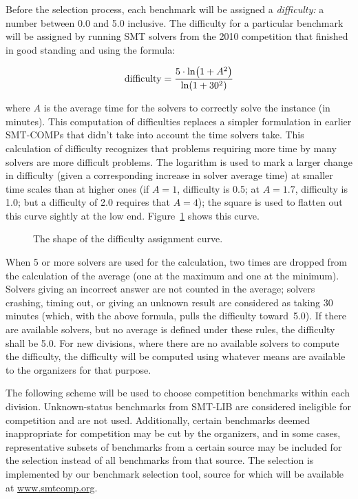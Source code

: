 \documentclass[12pt]{article}
\begin{document}
Before the selection process, each benchmark will be assigned a
\emph{difficulty:} a number between 0.0 and 5.0 inclusive.  The
difficulty for a particular benchmark will be assigned by running SMT
solvers from the 2010 competition that finished in good
standing and using the formula:

\[\mathrm{difficulty} = {5\cdot\ln\!\left(1+A^2\right) \over \ln\!\left(1+30^2\right)}\]

\noindent
where $A$ is the average time for the solvers to correctly solve the
instance (in minutes).  This computation of difficulties
replaces a simpler formulation in earlier SMT-COMPs that didn't take
into account the time solvers take.  This calculation of difficulty
recognizes that problems requiring more time by many solvers are
more difficult problems.  The logarithm is used to
mark a larger change in difficulty (given a corresponding increase in
solver average time) at smaller time scales than at higher ones (if $A=1$,
difficulty is 0.5; at $A=1.7$, difficulty is 1.0; but a difficulty of 2.0
requires that $A=4$); the square is used to flatten out this curve sightly
at the low end.  Figure~\ref{difficultyplot} shows this curve.

\begin{figure}
  \centerline{}
  \caption{The shape of the difficulty assignment curve.}
  \label{difficultyplot}
\end{figure}

When 5 or more solvers are used for the
calculation, two times are dropped from the calculation of the average
(one at the maximum and one at the minimum).  Solvers giving an
incorrect answer are not counted in the average; solvers crashing,
timing out, or giving an unknown result are considered as taking 30
minutes (which, with the above formula, pulls the difficulty
toward~5.0).  If there are available solvers, but no average is
defined under these rules, the difficulty shall be 5.0.  For new
divisions, where there are no available solvers to compute the
difficulty, the difficulty will be computed using whatever means are
available to the organizers for that purpose.

The following scheme will be used to choose competition benchmarks
within each division.  Unknown-status benchmarks from SMT-LIB are
considered ineligible for competition and are not used.
%
Additionally, certain benchmarks deemed inappropriate for competition
may be cut by the organizers, and in some cases, representative subsets
of benchmarks from a certain source may be included for the selection
instead of all benchmarks from that source.
%
The selection
is implemented by our benchmark selection tool, source for which will
be available at \url{www.smtcomp.org}.
\end{document}
